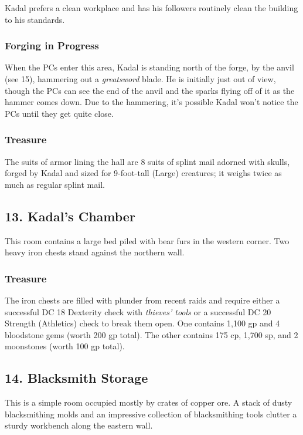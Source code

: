 \documentclass[10pt,a4paper,twoside,bg=print,twocolumn,openany,nodeprecatedcode]{dndbook}
\begin{document}
Kadal prefers a clean workplace and has his followers routinely clean the building to his standards.

\subsubsection{Forging in Progress}
When the PCs enter this area, Kadal is standing north of the forge, by the anvil (see 15), hammering out a \textit{greatsword} blade. He is initially just out of view, though the PCs can see the end of the anvil and the sparks flying off of it as the hammer comes down. Due to the hammering, it's possible Kadal won't notice the PCs until they get quite close.

\subsubsection{Treasure}
The suits of armor lining the hall are 8 suits of splint mail adorned with skulls, forged by Kadal and sized for 9-foot-tall (Large) creatures; it weighs twice as much as regular splint mail.

\subsection{13. Kadal's Chamber}
\begin{DndReadAloud}{}
This room contains a large bed piled with bear furs in the western corner. Two heavy iron chests stand against the northern wall.

\end{DndReadAloud}

\subsubsection{Treasure}
The iron chests are filled with plunder from recent raids and require either a successful DC 18 Dexterity check with \textit{thieves' tools} or a successful DC 20 Strength (Athletics) check to break them open. One contains 1,100 gp and 4 bloodstone gems (worth 200 gp total). The other contains 175 cp, 1,700 sp, and 2 moonstones (worth 100 gp total).

\subsection{14. Blacksmith Storage}
\begin{DndReadAloud}{}
This is a simple room occupied mostly by crates of copper ore. A stack of dusty blacksmithing molds and an impressive collection of blacksmithing tools clutter a sturdy workbench along the eastern wall.

\end{DndReadAloud}
\end{document}

